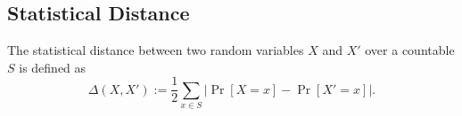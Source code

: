 \documentclass[conference]{IEEEtran}
\newtheorem{lemma}[theorem]{Lemma}
\newtheorem{definition}{Definition}[section]
\begin{document}
	
	
	\subsection{Statistical Distance}
		The statistical distance between two random variables $X$ and $X'$ over a countable $S$ is defined as
		$$\Delta(X,X'):=\frac{1}{2}\sum_{x\in S}\vert \Pr[X=x]-\Pr[X'=x]\vert.$$
		
	
	\fi	
	
\end{document}
